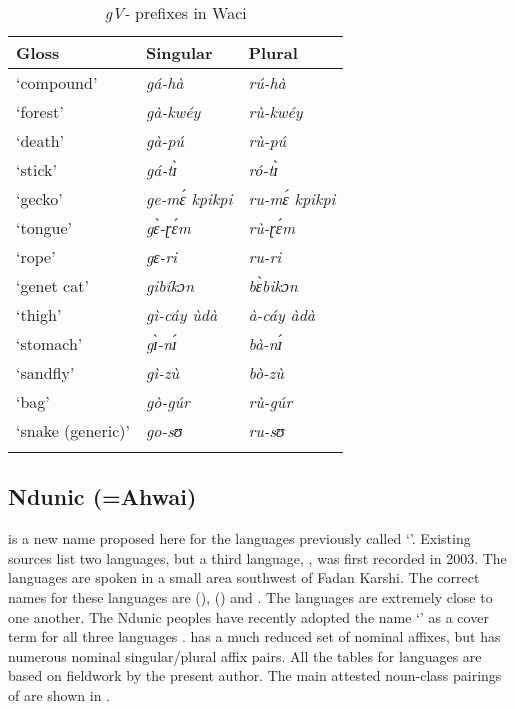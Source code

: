 \documentclass[output=paper]{langsci/langscibook}
\begin{document}
\begin{table}
\caption{\textit{gV-} prefixes in Waci}
\label{extab:nomaffplat:27}
\begin{tabularx}{\textwidth}{XXl}
\lsptoprule 
Gloss 	& {Singular} 	& {Plural}\\
\midrule
‘compound’ 	&  \itshape gá-hà 	&  \itshape rú-hà\\
‘forest’ 	&  \itshape gà-kwéy 	&  \itshape rù-kwéy\\
‘death’ 	&  \itshape gà-pú 	&  \itshape rù-pú\\
‘stick’ 	&  \itshape gá-tɪ̀	&  \itshape ró-tɪ̀\\
‘gecko’ 	&  \itshape ge-mɛ́ kpikpi 	&  \itshape  ru-mɛ́ kpikpi\\
‘tongue’ 	&  \itshape gɛ̀-ɽɛ́m 	&  \itshape rù-ɽɛ́m\\
‘rope’ 	&  \itshape gɛ-ri 	&  \itshape ru-ri\\
‘genet cat’ 	&  \itshape gibíkɔn 	&  \itshape bɛ̀bikɔn\\
‘thigh’ 	&  \itshape gì-cáy ùdà 	&  \itshape à-cáy àdà\\
‘stomach’ 	&  \itshape gɪ̀-nɪ́ 	&  \itshape bà-nɪ́\\
‘sandfly’ 	&  \itshape gì-zù 	&  \itshape bò-zù\\
‘bag’ 	&  \itshape gò-gúr 	&  \itshape rù-gúr\\
‘snake (generic)’ 	&  \itshape go-sʊ 	&  \itshape ru-sʊ\\
\lspbottomrule
\end{tabularx}
\end{table}

\subsection{Ndunic (=Ahwai)} \label{sec:nomaffplat:2.4}

 is a new name proposed here for the languages previously called ‘’. Existing sources list two languages, but a third language, , was first recorded in 2003. The  languages are spoken in a small area southwest of Fadan Karshi. The correct names for these languages are  (),  () and . The languages are extremely close to one another. The Ndunic peoples have recently adopted the name ‘’ as a cover term for all three languages \citep{RueckEtAl2008}.  has a much reduced set of nominal affixes, but  has numerous nominal singular/plural affix pairs. All the tables for  languages are based on fieldwork by the present author. The main attested noun-class pairings of  are shown in .
\end{document}
